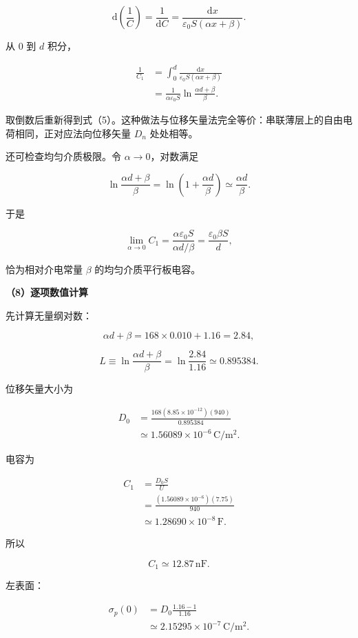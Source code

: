 \documentclass[12pt,a4paper,UTF8]{ctexart}
\begin{document}
\[
\mathrm d\!\left(\frac1C\right)
=\frac1{\mathrm dC}
=\frac{\mathrm dx}{\varepsilon_0S(\alpha x+\beta)}.
\tag{11}
\]

从 \(0\) 到 \(d\) 积分，

\[
\begin{aligned}
\frac1{C_1}
&=\int_0^d
\frac{\mathrm dx}{\varepsilon_0S(\alpha x+\beta)}\\
&=\frac1{\alpha\varepsilon_0S}
\ln\frac{\alpha d+\beta}{\beta}.
\end{aligned}
\]

取倒数后重新得到式（5）。这种做法与位移矢量法完全等价：串联薄层上的自由电荷相同，正对应法向位移矢量
\(D_n\) 处处相等。

还可检查均匀介质极限。令 \(\alpha\to0\)，对数满足

\[
\ln\frac{\alpha d+\beta}{\beta}
=\ln\left(1+\frac{\alpha d}{\beta}\right)
\simeq\frac{\alpha d}{\beta}.
\]

于是

\[
\lim_{\alpha\to0}C_1
=\frac{\alpha\varepsilon_0S}{\alpha d/\beta}
=\frac{\varepsilon_0\beta S}{d},
\tag{12}
\]

恰为相对介电常量 \(\beta\) 的均匀介质平行板电容。

\textbf{（8）逐项数值计算}

先计算无量纲对数：

\[
\alpha d+\beta
=168\times0.010+1.16
=2.84,
\]

\[
L\equiv
\ln\frac{\alpha d+\beta}{\beta}
=\ln\frac{2.84}{1.16}
\simeq0.895384.
\tag{13}
\]

位移矢量大小为

\[
\begin{aligned}
D_0
&=\frac{168(8.85\times10^{-12})(940)}
{0.895384}\\
&\simeq1.56089\times10^{-6}\,
\mathrm{C/m^2}.
\end{aligned}
\tag{14}
\]

电容为

\[
\begin{aligned}
C_1
&=\frac{D_0S}{U}\\
&=\frac{(1.56089\times10^{-6})(7.75)}{940}\\
&\simeq1.28690\times10^{-8}\,\mathrm F.
\end{aligned}
\]

所以

\[
\boxed{C_1\simeq12.87\,\mathrm{nF}}.
\tag{15}
\]

左表面：

\[
\begin{aligned}
\sigma_p(0)
&=D_0\frac{1.16-1}{1.16}\\
&\simeq2.15295\times10^{-7}\,
\mathrm{C/m^2}.
\end{aligned}
\tag{16}
\]
\end{document}
